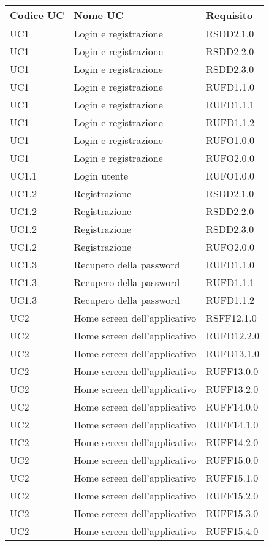 \begin{longtable}{lp{}l}
\toprule Codice UC & Nome UC  & Requisito\\
\midrule
UC1 & Login e registrazione & RSDD2.1.0 \\
UC1 & Login e registrazione & RSDD2.2.0 \\
UC1 & Login e registrazione & RSDD2.3.0 \\
UC1 & Login e registrazione & RUFD1.1.0 \\
UC1 & Login e registrazione & RUFD1.1.1 \\
UC1 & Login e registrazione & RUFD1.1.2 \\
UC1 & Login e registrazione & RUFO1.0.0 \\
UC1 & Login e registrazione & RUFO2.0.0 \\
UC1.1 & Login utente & RUFO1.0.0 \\
UC1.2 & Registrazione & RSDD2.1.0 \\
UC1.2 & Registrazione & RSDD2.2.0 \\
UC1.2 & Registrazione & RSDD2.3.0 \\
UC1.2 & Registrazione & RUFO2.0.0 \\
UC1.3 & Recupero della password & RUFD1.1.0 \\
UC1.3 & Recupero della password & RUFD1.1.1 \\
UC1.3 & Recupero della password & RUFD1.1.2 \\
UC2 & Home screen dell'applicativo & RSFF12.1.0 \\
UC2 & Home screen dell'applicativo & RUFD12.2.0 \\
UC2 & Home screen dell'applicativo & RUFD13.1.0 \\
UC2 & Home screen dell'applicativo & RUFF13.0.0 \\
UC2 & Home screen dell'applicativo & RUFF13.2.0 \\
UC2 & Home screen dell'applicativo & RUFF14.0.0 \\
UC2 & Home screen dell'applicativo & RUFF14.1.0 \\
UC2 & Home screen dell'applicativo & RUFF14.2.0 \\
UC2 & Home screen dell'applicativo & RUFF15.0.0 \\
UC2 & Home screen dell'applicativo & RUFF15.1.0 \\
UC2 & Home screen dell'applicativo & RUFF15.2.0 \\
UC2 & Home screen dell'applicativo & RUFF15.3.0 \\
UC2 & Home screen dell'applicativo & RUFF15.4.0 \\

\end{longtable}
